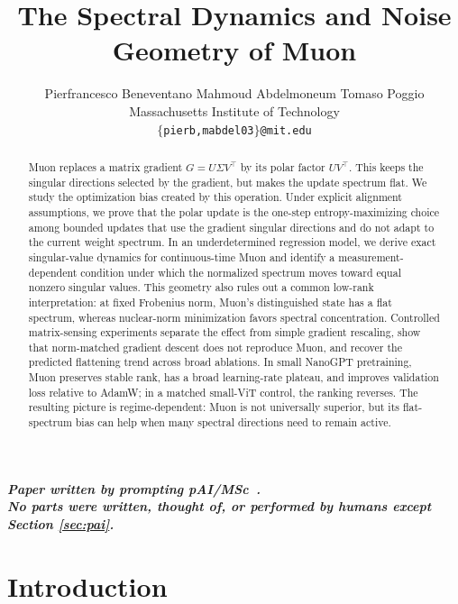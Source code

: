 \documentclass{article}
\title{The Spectral Dynamics and Noise Geometry of Muon}
\author{%
  Pierfrancesco Beneventano \quad Mahmoud Abdelmoneum \quad Tomaso Poggio \\
  Massachusetts Institute of Technology\\
  \texttt{$\{$pierb,mabdel03$\}$@mit.edu}
}
\begin{document}
\maketitle

\begin{summarybox}
\centering
\textit{\color{mydarkblue}\textbf{Paper written by prompting pAI/MSc~\citep{abdelmoneum2026paimsc}.}}\\
\textit{\color{mydarkblue}\textbf{No parts were written, thought of, or performed by humans except Section \ref{sec:pai}.}}
\end{summarybox}

\begin{abstract}
Muon replaces a matrix gradient \(G=U\Sigma V^\top\) by its polar factor \(UV^\top\). This keeps the singular directions selected by the gradient, but makes the update spectrum flat. We study the optimization bias created by this operation. Under explicit alignment assumptions, we prove that the polar update is the one-step entropy-maximizing choice among bounded updates that use the gradient singular directions and do not adapt to the current weight spectrum. In an underdetermined regression model, we derive exact singular-value dynamics for continuous-time Muon and identify a measurement-dependent condition under which the normalized spectrum moves toward equal nonzero singular values. This geometry also rules out a common low-rank interpretation: at fixed Frobenius norm, Muon's distinguished state has a flat spectrum, whereas nuclear-norm minimization favors spectral concentration. Controlled matrix-sensing experiments separate the effect from simple gradient rescaling, show that norm-matched gradient descent does not reproduce Muon, and recover the predicted flattening trend across broad ablations. In small NanoGPT pretraining, Muon preserves stable rank, has a broad learning-rate plateau, and improves validation loss relative to AdamW; in a matched small-ViT control, the ranking reverses. The resulting picture is regime-dependent: Muon is not universally superior, but its flat-spectrum bias can help when many spectral directions need to remain active.
\end{abstract}
\section{Introduction}
\label{sec:intro}

\end{document}

